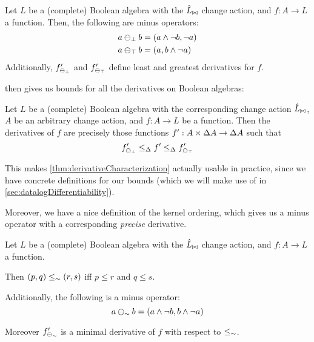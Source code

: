 \begin{prop}
  \label{prop:minimalMaximalDerivatives}
  Let $L$ be a (complete) Boolean algebra with the $\hat{L}_{\bowtie}$ change action, and
  $f: A \rightarrow L$ a function.
  Then, the following are minus operators:
  \begin{align*}
    a \ominus_\bot b &= (a \wedge \neg b, \neg a)\\
    a \ominus_\top b &= (a, b \wedge \neg a)
  \end{align*}
  Additionally, $f'_{\ominus_{\bot}}$ and $f'_{\ominus_{\top}}$ 
  define least and greatest derivatives for $f$.
\end{prop}

 then gives us bounds for
all the derivatives on Boolean algebras:

\begin{corollary}
\label{cor:booleanCharacterization}
  Let $L$ be a (complete) Boolean algebra with the corresponding change action
  $\hat{L}_{\bowtie}$, $A$ be an arbitrary change action, and $f: A \rightarrow
  L$ be a function. Then the derivatives of $f$ are precisely those functions
  $f': A \times \Delta A \rightarrow \Delta A$ such that
  \begin{displaymath}
    f'_{\ominus_{\bot}}
    \leq_\Delta
    f'
    \leq_\Delta
    f'_{\ominus_{\top}}
  \end{displaymath}
\end{corollary}

This makes \cref{thm:derivativeCharacterization} actually usable in practice, since
we have concrete definitions for our bounds (which we will make use of in \cref{sec:datalogDifferentiability}).

Moreover, we have a nice definition of the kernel ordering, which gives us a
minus operator with a corresponding \emph{precise} derivative.


\begin{prop}
  Let $L$ be a (complete) Boolean algebra with the $\hat{L}_{\bowtie}$ change action, and
  $f: A \rightarrow L$ a function.

  Then $(p, q) \leq_\sim (r, s)$ iff $p \leq r$ and $q \leq s$.

  Additionally, the following is a minus operator:
  \begin{displaymath}
    a \ominus_\sim b = (a \wedge \neg b, b \wedge \neg a)
  \end{displaymath}

  Moreover $f'_{\ominus_\sim}$ is a minimal derivative of $f$ with respect to $\leq_\sim$.
\end{prop}

